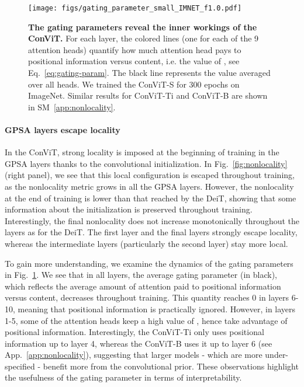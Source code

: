 \begin{figure}[t]
    \centering
    \texttt{[image: figs/gating\_parameter\_small\_IMNET\_f1.0.pdf]}
    \caption{\textbf{The gating parameters reveal the inner workings of the ConViT.} For each layer, the colored lines (one for each of the 9 attention heads) quantify how much attention head  pays to positional information versus content, i.e. the value of , see Eq.~\ref{eq:gating-param}. The black line represents the value averaged over all heads. We trained the ConViT-S for 300 epochs on ImageNet. Similar results for ConViT-Ti and ConViT-B are shown in SM~\ref{app:nonlocality}.}
    \label{fig:gating}
\end{figure}

\paragraph{GPSA layers escape locality}

In the ConViT, strong locality is imposed at the beginning of training in the GPSA layers thanks to the convolutional initialization. In Fig.~\ref{fig:nonlocality} (right panel), we see that this local configuration is escaped throughout training, as the nonlocality metric grows in all the GPSA layers. However, the nonlocality at the end of training is lower than that reached by the DeiT, showing that some information about the initialization is preserved throughout training. Interestingly, the final nonlocality does not increase monotonically throughout the layers as for the DeiT. The first layer and the final layers strongly escape locality, whereas the intermediate layers (particularly the second layer) stay more local. 

To gain more understanding, we examine the dynamics of the gating parameters in Fig.~\ref{fig:gating}. We see that in all layers, the average gating parameter  (in black), which reflects the average amount of attention paid to positional information versus content, decreases throughout training. This quantity reaches 0 in layers 6-10, meaning that positional information is practically ignored. However, in layers 1-5, some of the attention heads keep a high value of 
, hence take advantage of positional information. Interestingly, the ConViT-Ti only uses positional information up to layer 4, whereas the ConViT-B uses it up to layer 6 (see App.~\ref{app:nonlocality}), suggesting that larger models - which are more under-specified - benefit more from the convolutional prior. These observations highlight the usefulness of the gating parameter in terms of interpretability.

